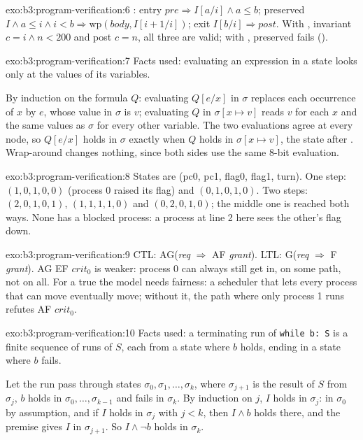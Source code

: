 \begin{solution}{exo:b3:program-verification:6}
: entry $\mathit{pre} \Rightarrow I[a/i] \wedge a \le b$; preserved $I \wedge a \le i \wedge i < b \Rightarrow \mathrm{wp}(\mathit{body}, I[i + 1/i])$; exit $I[b/i] \Rightarrow \mathit{post}$. With , invariant $c = i \wedge n < 200$ and post $c = n$, all three are valid; with , preserved fails ().
\end{solution}

\begin{solution}{exo:b3:program-verification:7}
Facts used: evaluating an expression in a state looks only at the values of its variables.

By induction on the formula $Q$: evaluating $Q[e/x]$ in $\sigma$ replaces each occurrence of $x$ by $e$, whose value in $\sigma$ is $v$; evaluating $Q$ in $\sigma[x \mapsto v]$ reads $v$ for each $x$ and the same values as $\sigma$ for every other variable. The two evaluations agree at every node, so $Q[e/x]$ holds in $\sigma$ exactly when $Q$ holds in $\sigma[x \mapsto v]$, the state after . Wrap-around changes nothing, since both sides use the same 8-bit evaluation.
\end{solution}

\begin{solution}{exo:b3:program-verification:8}
States are (pc0, pc1, flag0, flag1, turn). One step: $(1, 0, 1, 0, 0)$ (process 0 raised its flag) and $(0, 1, 0, 1, 0)$. Two steps: $(2, 0, 1, 0, 1)$, $(1, 1, 1, 1, 0)$ and $(0, 2, 0, 1, 0)$; the middle one is reached both ways. None has a blocked process: a process at line 2 here sees the other's flag down.
\end{solution}

\begin{solution}{exo:b3:program-verification:9}
CTL: AG(\textit{req} $\Rightarrow$ AF \textit{grant}). LTL: G(\textit{req} $\Rightarrow$ F \textit{grant}). AG EF $\mathit{crit}_0$ is weaker: process 0 can always still get in, on some path, not on all. For a true  the model needs fairness: a scheduler that lets every process that can move eventually move; without it, the path where only process 1 runs refutes AF $\mathit{crit}_0$.
\end{solution}

\begin{solution}{exo:b3:program-verification:10}
Facts used: a terminating run of \texttt{while b:\ S} is a finite sequence of runs of $S$, each from a state where $b$ holds, ending in a state where $b$ fails.

Let the run pass through states $\sigma_0, \sigma_1, \ldots, \sigma_k$, where $\sigma_{j+1}$ is the result of $S$ from $\sigma_j$, $b$ holds in $\sigma_0, \ldots, \sigma_{k-1}$ and fails in $\sigma_k$. By induction on $j$, $I$ holds in $\sigma_j$: in $\sigma_0$ by assumption, and if $I$ holds in $\sigma_j$ with $j < k$, then $I \wedge b$ holds there, and the premise gives $I$ in $\sigma_{j+1}$. So $I \wedge \neg b$ holds in $\sigma_k$.
\end{solution}

